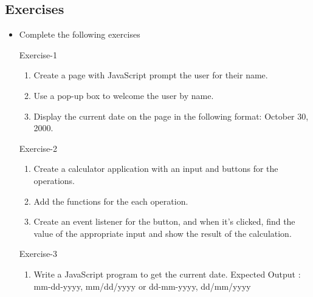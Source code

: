 \documentclass[11pt,a4paper]{article}
\begin{document}
\subsection*{Exercises}
\begin{itemize}
\item Complete the following  exercises
\item[Exercise-1]\
\begin{enumerate}[label=\bfseries Q\arabic*:]\itemsep10pt
\item Create a page with JavaScript prompt the user for their name.
\item Use a pop-up box to welcome the user by name.
\item Display the current date on the page in the following format: October 30, 2000.  
\end{enumerate}
\item[Exercise-2]\
\begin{enumerate}[label=\bfseries Q\arabic*:]\itemsep10pt
\item Create a calculator application with an input and buttons for the operations.
\item Add the functions for the each operation.
\item Create an event listener for the button, and when it's clicked, find the value of the appropriate input and show the result of the calculation.
\end{enumerate}
\item[Exercise-3]\
\begin{enumerate}[label=\bfseries Q\arabic*:]\itemsep10pt
\item Write a JavaScript program to get the current date. 
Expected Output : mm-dd-yyyy, mm/dd/yyyy or dd-mm-yyyy, dd/mm/yyyy 
\end{enumerate}
\end{itemize}
\end{document}
